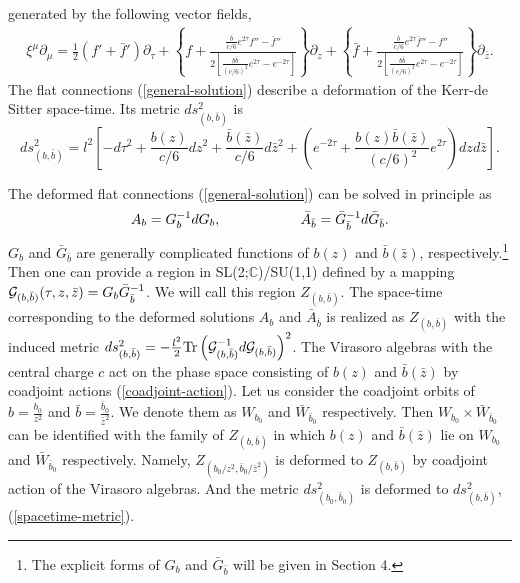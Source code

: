 \documentclass[a4paper,11pt]{article}
\begin{document}
generated by the following vector fields,
\begin{eqnarray}
 \xi^\mu \partial_\mu=\frac{1}{2}(f'+\bar{f}')\partial_\tau
     +\left\{f+\frac{\frac{\bar{b}}{c/6}e^{2\tau}f''-\bar{f}''}
                {2\left[\frac{b\bar{b}}{(c/6)^2}e^{2\tau}-e^{-2\tau}\right]}
      \right\}\partial_z
     +\left\{\bar{f}+\frac{\frac{b}{c/6}e^{2\tau}\bar{f}''-f''}
                {2\left[\frac{b\bar{b}}{(c/6)^2}e^{2\tau}-e^{-2\tau}\right]}
      \right\}\partial_{\bar{z}}.
\end{eqnarray}
The flat connections (\ref{general-solution}) describe 
a deformation of the Kerr-de Sitter space-time.
Its metric $ds^2_{(b, \bar{b})}$ is 
\begin{equation}
\label{spacetime-metric}
ds^2_{(b, \bar{b})}=l^2\left[- d\tau^2 +\frac{b(z)}{c/6}dz^2
                +\frac{\bar{b}(\bar{z})}{c/6}d\bar{z}^2
                +\left(e^{-2\tau}+\frac{b(z)\bar{b}(\bar{z})}{(c/6)^2}
                  e^{2\tau}\right)dzd\bar{z} \right].
\end{equation}

The deformed flat connections (\ref{general-solution}) can be solved 
in principle as 
\begin{equation}
\label{G_b}
A_b=G_b^{-1}dG_b, \hspace{20mm} 
\bar{A}_{\bar{b}}=\bar{G}_{\bar{b}}^{-1}d\bar{G}_{\bar{b}}.
\end{equation}
$G_b$ and $\bar{G}_{\bar{b}}$ are generally complicated functions of 
$b(z)$ and $\bar{b}(\bar{z})$, respectively.\footnote{
The explicit forms of $G_b$ and $\bar{G}_{\bar{b}}$ will be given 
in Section 4.}
Then one can provide a region in SL(2;$\mathbb{C}$)/SU(1,1) defined by 
a mapping 
${\cal G}_{(b,\bar{b})}(\tau, z, \bar{z})=G_b\bar{G}_{\bar{b}}^{-1}$. 
We will call this region $Z_{(b,\bar{b})}$.
The space-time corresponding to the deformed solutions 
$A_b$ and $\bar{A}_{\bar{b}}$ is realized as  $Z_{(b,\bar{b})}$  
with the induced metric 
$ds^2_{(b, \bar{b})}=-\frac{l^2}{2}\mbox{Tr}
\left({\cal G}_{(b,\bar{b})}^{-1}d{\cal G}_{(b,\bar{b})}\right)^2$.
The Virasoro algebras with the central charge $c$ act on the phase space
consisting of $b(z)$ and $\bar{b}(\bar{z})$ by coadjoint actions
(\ref{coadjoint-action}). 
Let us consider the coadjoint orbits of $b=\frac{b_0}{z^2}$ 
and $\bar{b}=\frac{\bar{b}_0}{\bar{z}^2}$.
We denote them as $W_{b_0}$ and $\bar{W}_{\bar{b}_0}$ respectively. 
Then $W_{b_0}\times \bar{W}_{\bar{b}_0}$ can be identified with 
the family of $Z_{(b, \bar{b})}$ in which $b(z)$ and $\bar{b}(\bar{z})$ 
lie on $W_{b_0}$ and $\bar{W}_{\bar{b}_0}$ respectively.
Namely, $Z_{\scriptscriptstyle\left(b_0/z^2, \bar{b}_0/\bar{z}^2\right)}$ 
is deformed to $Z_{(b, \bar{b})}$ by coadjoint action of 
the Virasoro algebras.
And the metric $ds^2_{(b_0, \bar{b}_0)}$ is deformed to 
$ds^2_{(b, \bar{b})}$, (\ref{spacetime-metric}).
\end{document}
